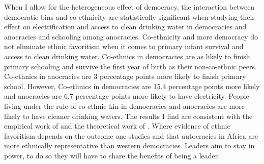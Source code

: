 \documentclass{wptemp}
\begin{document}
When I allow for the heterogeneous effect of democracy, the interaction between democratic bins and co-ethnicity are statistically significant when studying their effect on electrification and access to clean drinking water in democracies and anocracies and schooling among anocracies. Co-ethnicity and more democracy do not eliminate ethnic favoritism when it comes to primary infant survival and access to clean drinking water. Co-ethnics in democracies are as likely to finish primary schooling and survive the first year of birth as their non-co-ethnic peers. Co-ethnics in anocracies are 3 percentage points more likely to finish primary school. However, Co-ethnics in democracies are 15.4 percentage points more likely and anocracies are 6.7 percentage points more likely to have electricity. People living under the rule of co-ethnic kin in democracies and anocracies are more likely to have cleaner drinking waters. The results I find are consistent with the empirical work of \citet{kramon2013benefits} and the theoretical work of \citet{francois2015power}. Where evidence of ethnic favoritism depends on the outcome one studies and that autocracies in Africa are more ethnically representative than western democracies. Leaders aim to stay in power, to do so they will have to share the benefits of being a leader.


\pagebreak

\pagebreak
\nocite{*}
\end{document}
